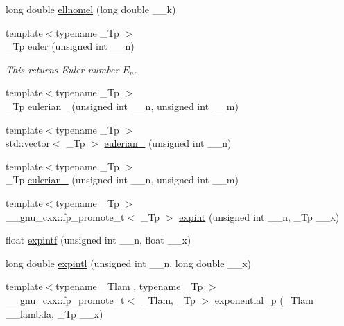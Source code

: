 \begin{DoxyCompactItemize}
\item 
long double \hyperlink{group__gnu__math__spec__func_ga0774570b24f654f8ae39e1865613a4e2}{ellnomel} (long double \+\_\+\+\_\+k)
\item 
{\footnotesize template$<$typename \+\_\+\+Tp $>$ }\\\+\_\+\+Tp \hyperlink{group__gnu__math__spec__func_gac956e6457ab7d0d1765d281e73073f55}{euler} (unsigned int \+\_\+\+\_\+n)
\begin{DoxyCompactList}\small\item\em This returns Euler number $ E_n $. \end{DoxyCompactList}\item 
{\footnotesize template$<$typename \+\_\+\+Tp $>$ }\\\+\_\+\+Tp \hyperlink{group__gnu__math__spec__func_gadfd8810a97655d2cdd1b0e3af68a79d3}{eulerian\+\_} (unsigned int \+\_\+\+\_\+n, unsigned int \+\_\+\+\_\+m)
\item 
{\footnotesize template$<$typename \+\_\+\+Tp $>$ }\\std\+::vector$<$ \+\_\+\+Tp $>$ \hyperlink{group__gnu__math__spec__func_ga6597229d2557ccf12fd9c50a66919ceb}{eulerian\+\_} (unsigned int \+\_\+\+\_\+n)
\item 
{\footnotesize template$<$typename \+\_\+\+Tp $>$ }\\\+\_\+\+Tp \hyperlink{group__gnu__math__spec__func_ga9bc456941d5e35cf54ec9c50f2e52884}{eulerian\+\_} (unsigned int \+\_\+\+\_\+n, unsigned int \+\_\+\+\_\+m)
\item 
{\footnotesize template$<$typename \+\_\+\+Tp $>$ }\\\+\_\+\+\_\+gnu\+\_\+cxx\+::fp\+\_\+promote\+\_\+t$<$ \+\_\+\+Tp $>$ \hyperlink{group__gnu__math__spec__func_gadaf9317953b826975da72d1858f01ea5}{expint} (unsigned int \+\_\+\+\_\+n, \+\_\+\+Tp \+\_\+\+\_\+x)
\item 
float \hyperlink{group__gnu__math__spec__func_ga85751691a29807d99e990fcba61312f3}{expintf} (unsigned int \+\_\+\+\_\+n, float \+\_\+\+\_\+x)
\item 
long double \hyperlink{group__gnu__math__spec__func_ga720ca0b275784c8b82193f427a2b3553}{expintl} (unsigned int \+\_\+\+\_\+n, long double \+\_\+\+\_\+x)
\item 
{\footnotesize template$<$typename \+\_\+\+Tlam , typename \+\_\+\+Tp $>$ }\\\+\_\+\+\_\+gnu\+\_\+cxx\+::fp\+\_\+promote\+\_\+t$<$ \+\_\+\+Tlam, \+\_\+\+Tp $>$ \hyperlink{group__gnu__math__spec__func_gaa546f47f8ab943d2c10b56bec8a44079}{exponential\+\_\+p} (\+\_\+\+Tlam \+\_\+\+\_\+lambda, \+\_\+\+Tp \+\_\+\+\_\+x)

\end{DoxyCompactItemize}
